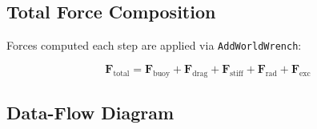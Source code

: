 \documentclass[12pt,a4paper]{article}
\newcommand{\Fvec}{\mathbf{F}}
\begin{document}
\subsection{Total Force Composition}

Forces computed each step are applied via \texttt{AddWorldWrench}:

\begin{equation}
  \boxed{
  \Fvec_{\text{total}}
    = \Fvec_{\text{buoy}}
    + \Fvec_{\text{drag}}
    + \Fvec_{\text{stiff}}
    + \Fvec_{\text{rad}}
    + \Fvec_{\text{exc}}
  }
  \label{eq:force_sum}
\end{equation}

\subsection{Data-Flow Diagram}
\end{document}
